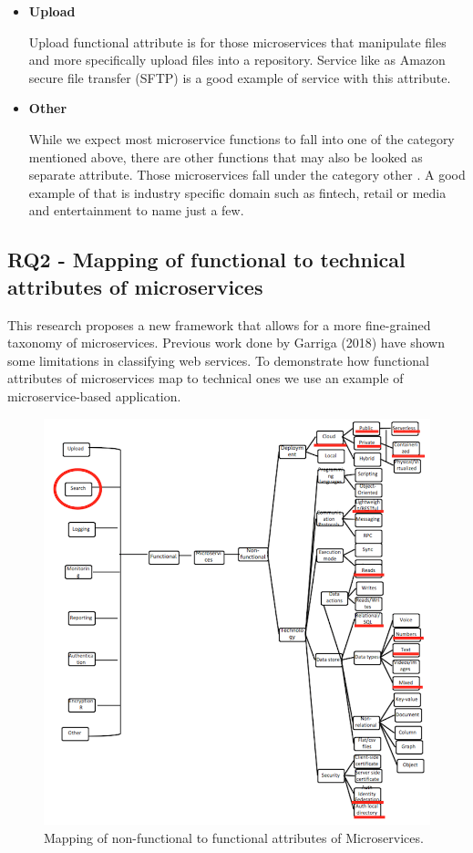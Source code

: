 \documentclass{article}
\begin{document}
\begin{itemize}
\item \textbf{Upload}

Upload functional attribute is for those microservices that manipulate files and more specifically upload files into a repository. Service like as Amazon secure file transfer (SFTP) is a good example of service with this attribute.

\item \textbf{Other}

While we expect most microservice functions to fall into one of the category mentioned above, there are other functions that may also be looked as separate attribute. Those microservices fall under the category other . A good example of that is industry specific domain such as fintech, retail or media and entertainment to name just a few.

\end{itemize}

\subsection{RQ2 - Mapping of functional to technical attributes of microservices}

This research proposes a new framework that allows for a more fine-grained taxonomy of microservices. Previous work done by Garriga (2018) have shown some limitations in classifying web services. To demonstrate how functional attributes of microservices map to technical ones we use an example of microservice-based application.

\begin{figure}[h!]
\includegraphics{func2techmapping.png}
\caption{Mapping of non-functional to functional attributes of Microservices.}
\end{figure}
\end{document}
